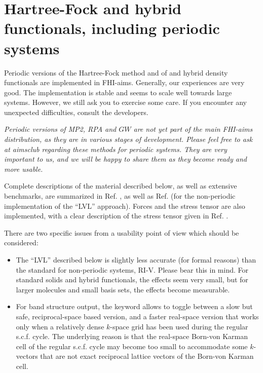 \section{Hartree-Fock and hybrid functionals, including periodic systems}
\label{Sec:periodic_hf}

Periodic versions of the Hartree-Fock method and of and hybrid density
functionals are implemented in FHI-aims. Generally, our experiences are
very good. The implementation is stable and seems to scale well
towards large systems. However, we still ask you to exercise some
care. If you encounter any unexpected difficulties, 
consult the developers.

\emph{Periodic versions of MP2, RPA and $GW$ are not yet part of the 
main FHI-aims 
distribution, as they are in various stages of development. Please feel
free to ask at aimsclub regarding these methods for periodic systems.
They are very important to us, and we will be happy to share them as
they become ready and more usable.}

Complete descriptions of the material described below, as well as
extensive benchmarks, are summarized in Ref. \cite{Levchenko2015}, as
well as Ref. \cite{Ihrig2015} (for the non-periodic implementation of
the ``LVL'' approach). Forces and the stress tensor are also
implemented, with a clear description of the stress tensor given in
Ref. \cite{Knuth2015}. 

There are two specific issues from a usability point of view which
should be considered:
\begin{itemize}
  \item The  ``LVL'' described below is slightly less
    accurate (for formal reasons) than the standard for non-periodic
    systems, RI-V. Please bear this in mind. For standard solids and
    hybrid functionals, the effects seem very small, but for larger
    molecules and small basis sets, the effects become measurable.
  \item For band structure output, the
     keyword  allows to toggle
    between a slow but safe, reciprocal-space based version, and a
    faster real-space version that works only when a relatively dense
    $k$-space grid has been used during the regular s.c.f. cycle. The
    underlying reason is that the real-space Born-von Karman cell of
    the regular s.c.f. cycle may become too small to accommodate some
    $k$-vectors that are not exact reciprocal lattice vectors of the
    Born-von Karman cell.
\end{itemize}

